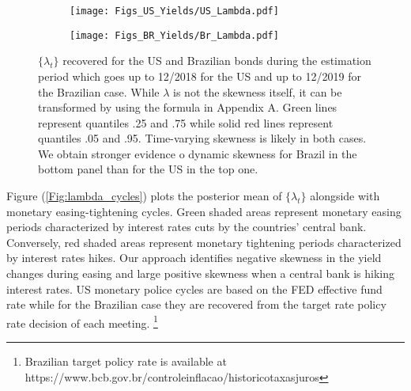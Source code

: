 \documentclass{article}
\begin{document}
\begin{figure}[h!]
\centering
\begin{subfigure}[b]{0.95\textwidth}
\texttt{[image: Figs\_US\_Yields/US\_Lambda.pdf]} 
   \caption{}
   \label{fig:us_lambda} 
\end{subfigure}
\begin{subfigure}[b]{0.95\textwidth}
\texttt{[image: Figs\_BR\_Yields/Br\_Lambda.pdf]} 
   \caption{}
   \label{fig:br_lambda}
\end{subfigure}
\caption{$\{\lambda_t\}$ recovered for the US and Brazilian bonds during the estimation period which goes up to 12/2018 for the US and up to 12/2019 for the Brazilian case. While $\lambda$ is not the skewness itself, it can be transformed by using the formula in Appendix A. Green lines represent quantiles .25 and .75 while solid red lines represent quantiles .05 and .95. Time-varying skewness is likely in both cases. We obtain stronger evidence o dynamic skewness for Brazil in the bottom panel than for the US in the top one.}
\label{Fig:lambda_plots}
\end{figure}

Figure (\ref{Fig:lambda_cycles}) plots the posterior mean of $\{\lambda_t\}$ alongside with monetary easing-tightening cycles. Green shaded areas represent monetary easing periods characterized by interest rates cuts by the countries' central bank. Conversely, red shaded areas represent monetary tightening periods characterized by interest rates hikes. Our approach identifies negative skewness in the yield changes during easing and large positive skewness when a central bank is hiking interest rates. US monetary police cycles are based on the FED effective fund rate while for the Brazilian case they are recovered from the target rate policy rate decision of each meeting. \footnote{Brazilian target policy rate is available at https://www.bcb.gov.br/controleinflacao/historicotaxasjuros}
\end{document}

